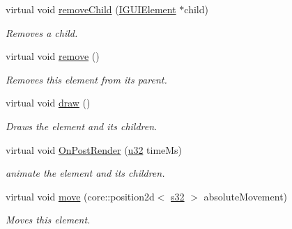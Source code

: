 \begin{DoxyCompactItemize}
virtual void \hyperlink{classirr_1_1gui_1_1IGUIElement_a3171cafaa9d2f3b67c886c60bdd61b32}{remove\+Child} (\hyperlink{classirr_1_1gui_1_1IGUIElement}{I\+G\+U\+I\+Element} $\ast$child)
\begin{DoxyCompactList}\small\item\em Removes a child. \end{DoxyCompactList}\item 
\mbox{\label{classirr_1_1gui_1_1IGUIElement_af8fb8c63d48ec6ceeeedc8a83c02a9d0}} 
virtual void \hyperlink{classirr_1_1gui_1_1IGUIElement_af8fb8c63d48ec6ceeeedc8a83c02a9d0}{remove} ()
\begin{DoxyCompactList}\small\item\em Removes this element from its parent. \end{DoxyCompactList}\item 
\mbox{\label{classirr_1_1gui_1_1IGUIElement_a1ef7eeaff67b8a9f4f37cacdc7e54be2}} 
virtual void \hyperlink{classirr_1_1gui_1_1IGUIElement_a1ef7eeaff67b8a9f4f37cacdc7e54be2}{draw} ()
\begin{DoxyCompactList}\small\item\em Draws the element and its children. \end{DoxyCompactList}\item 
\mbox{\label{classirr_1_1gui_1_1IGUIElement_ac71cf9174d4d35eca386657f01d744d1}} 
virtual void \hyperlink{classirr_1_1gui_1_1IGUIElement_ac71cf9174d4d35eca386657f01d744d1}{On\+Post\+Render} (\hyperlink{namespaceirr_a0416a53257075833e7002efd0a18e804}{u32} time\+Ms)
\begin{DoxyCompactList}\small\item\em animate the element and its children. \end{DoxyCompactList}\item 
\mbox{\label{classirr_1_1gui_1_1IGUIElement_a842eeacfcb26865416b084593a774704}} 
virtual void \hyperlink{classirr_1_1gui_1_1IGUIElement_a842eeacfcb26865416b084593a774704}{move} (core\+::position2d$<$ \hyperlink{namespaceirr_ac66849b7a6ed16e30ebede579f9b47c6}{s32} $>$ absolute\+Movement)
\begin{DoxyCompactList}\small\item\em Moves this element. \end{DoxyCompactList}\item 

\end{DoxyCompactItemize}
